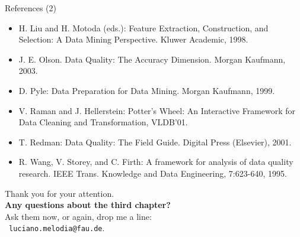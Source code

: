 \documentclass[aspectratio=169,t]{beamer}
\begin{document}
  {
    \begin{frame}{References (2)}
      \begin{itemize}
        \item H. Liu and H. Motoda (eds.): Feature Extraction, Construction, and Selection: A Data Mining Perspective. Kluwer Academic, 1998.
        \item J. E. Olson. Data Quality: The Accuracy Dimension. Morgan Kaufmann, 2003.
        \item D. Pyle: Data Preparation for Data Mining. Morgan Kaufmann, 1999.
        \item {\color{airforceblue}V. Raman and J. Hellerstein: Potter's Wheel: An Interactive Framework for Data Cleaning and Transformation, VLDB'01.}
        \item T. Redman: Data Quality: The Field Guide. Digital Press (Elsevier), 2001.
        \item R. Wang, V. Storey, and C. Firth: A framework for analysis of data quality research. IEEE Trans. Knowledge and Data Engineering, 7:623-640, 1995.
      \end{itemize}
    \end{frame}
  }

  { %
    \begin{frame}[c]
      \begin{center}
        Thank you for your attention.\\
        {\bf Any questions about the third chapter?}\\[0.5cm]
        Ask them now, or again, drop me a line: \\ 
        \faSendO \ \texttt{luciano.melodia@fau.de}.
      \end{center}
    \end{frame}
  }
\end{document}
